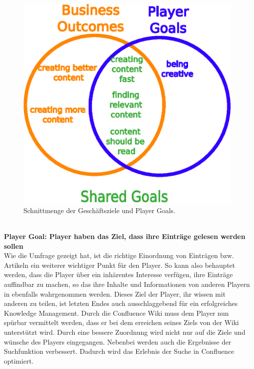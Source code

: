 \documentclass[a4paper,12pt]{scrartcl}
\begin{document}
\\\\
\begin{figure}[h!]
\begin{center}
\includegraphics[scale = 0.9]{Bilder/Schnittmenge.eps}
\caption{Schnittmenge der Geschäftsziele und Player Goals.}
\label{Schnittmenge}
\end{center}
\end{figure}
\\
\textbf{Player Goal: Player haben das Ziel, dass ihre Einträge gelesen werden sollen}\\
Wie die Umfrage gezeigt hat, ist die richtige Einordnung von Einträgen bzw. Artikeln ein weiterer wichtiger Punkt für den Player. So kann also behauptet werden, dass die Player über ein inhärentes Interesse verfügen, ihre Einträge auffindbar zu machen, so das ihre Inhalte und Informationen von anderen Playern in ebenfalls wahrgenommen werden. Dieses Ziel der Player, ihr wissen mit anderen zu teilen, ist letzten Endes auch ausschlaggebend für ein erfolgreiches Knowledge Management. Durch die Confluence Wiki muss dem Player nun spürbar vermittelt werden, dass er bei dem erreichen seines Ziels von der Wiki unterstützt wird. Durch eine bessere Zuordnung wird nicht nur auf die Ziele und wünsche des Players eingegangen. Nebenbei werden auch die Ergebnisse der Suchfunktion verbessert. Dadurch wird das Erlebnis der Suche in Confluence optimiert. 
\end{document}
